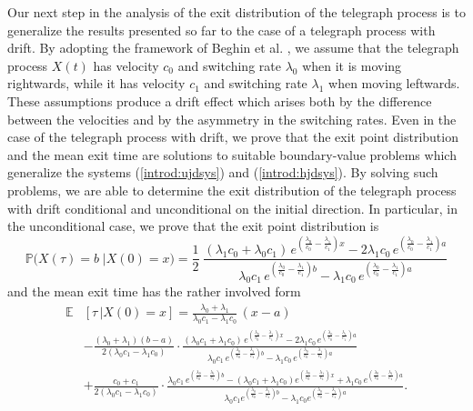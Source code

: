 \documentclass{article}
\begin{document}
Our next step in the analysis of the exit distribution of the telegraph process is to generalize the results presented so far to the case of a telegraph process with drift. By adopting the framework of Beghin et al. \cite{beghinnieddu}, we assume that the telegraph process $X(t)$ has velocity $c_0$ and switching rate $\lambda_0$ when it is moving rightwards, while it has velocity $c_1$ and switching rate $\lambda_1$ when moving leftwards. These assumptions produce a drift effect which arises both by the difference between the velocities and by the asymmetry in the switching rates. Even in the case of the telegraph process with drift, we prove that the exit point distribution and the mean exit time are solutions to suitable boundary-value problems which generalize the systems (\ref{introd:ujdsys}) and (\ref{introd:hjdsys}). By solving such problems, we are able to determine the exit distribution of the telegraph process with drift conditional and unconditional on the initial direction. In particular, in the unconditional case, we prove that the exit point distribution is
\begin{equation}\mathbb{P}\Big(X(\tau)=b\;\Big\lvert X(0)=x\Big)=\frac{1}{2}\;\frac{(\lambda_1c_0+\lambda_0c_1)\,e^{\left(\frac{\lambda_0}{c_0}-\frac{\lambda_1}{c_1}\right)x}-2\lambda_1c_0\,e^{\left(\frac{\lambda_0}{c_0}-\frac{\lambda_1}{c_1}\right)a}}{\lambda_0c_1\,e^{\left(\frac{\lambda_0}{c_0}-\frac{\lambda_1}{c_1}\right)b}-\lambda_1c_0\,e^{\left(\frac{\lambda_0}{c_0}-\frac{\lambda_1}{c_1}\right)a}}\label{introd:u_totsol_drift}\end{equation}
and the mean exit time has the rather involved form
\begin{align}\label{introd:got3drift}\mathbb{E}&\left[\tau\,\Big\lvert X(0)=x\right]=\frac{\lambda_0+\lambda_1}{\lambda_0c_1-\lambda_1c_0}\,(x-a)\nonumber\\
&-\frac{(\lambda_0+\lambda_1)(b-a)}{2(\lambda_0c_1-\lambda_1c_0)}\cdot\frac{(\lambda_0c_1+\lambda_1c_0)\,e^{\left(\frac{\lambda_0}{c_0}-\frac{\lambda_1}{c_1}\right)x}-2\lambda_1c_0\,e^{\left(\frac{\lambda_0}{c_0}-\frac{\lambda_1}{c_1}\right)a}}{\lambda_0c_1\,e^{\left(\frac{\lambda_0}{c_0}-\frac{\lambda_1}{c_1}\right)b}-\lambda_1c_0\,e^{\left(\frac{\lambda_0}{c_0}-\frac{\lambda_1}{c_1}\right)a}}\nonumber\\
&+\frac{c_0+c_1}{2(\lambda_0c_1-\lambda_1c_0)}\cdot\frac{\lambda_0c_1\,e^{\left(\frac{\lambda_0}{c_0}-\frac{\lambda_1}{c_1}\right)b}-(\lambda_0c_1+\lambda_1c_0)e^{\left(\frac{\lambda_0}{c_0}-\frac{\lambda_1}{c_1}\right)x}+\lambda_1c_0\,e^{\left(\frac{\lambda_0}{c_0}-\frac{\lambda_1}{c_1}\right)a}}{\lambda_0c_1e^{\left(\frac{\lambda_0}{c_0}-\frac{\lambda_1}{c_1}\right)b}-\lambda_1c_0e^{\left(\frac{\lambda_0}{c_0}-\frac{\lambda_1}{c_1}\right)a}}.
\end{align}
\end{document}
